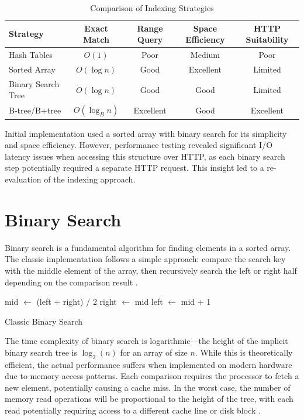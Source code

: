 \begin{table}[ht]
  \centering
  \caption{Comparison of Indexing Strategies}
  \begin{tabular}{l|c|c|c|c}
    \hline
    \textbf{Strategy} & \textbf{Exact Match} & \textbf{Range Query} & \textbf{Space Efficiency} & \textbf{HTTP Suitability} \\
    \hline
    Hash Tables & $O(1)$ & Poor & Medium & Poor \\
    Sorted Array & $O(\log n)$ & Good & Excellent & Limited \\
    Binary Search Tree & $O(\log n)$ & Good & Good & Limited \\
    B-tree/B+tree & $O(\log_B n)$ & Excellent & Good & Excellent \\
    \hline
  \end{tabular}
  \label{tab:indexing_strategies}
\end{table}

Initial implementation used a sorted array with binary search for its simplicity and space efficiency. However, performance testing revealed significant I/O latency issues when accessing this structure over HTTP, as each binary search step potentially required a separate HTTP request. This insight led to a re-evaluation of the indexing approach.

\section{Binary Search}
\label{tb:binary_search}

Binary search is a fundamental algorithm for finding elements in a sorted array. The classic implementation follows a simple approach: compare the search key with the middle element of the array, then recursively search the left or right half depending on the comparison result \citep{binary_search}.
\begin{algorithm}
  \BlankLine
  {
    mid $\leftarrow$ (left + right) / 2\;
    {
      right $\leftarrow$ mid\;
    }
    \Else
    {
      left $\leftarrow$ mid + 1\;
    }
  }
  \caption{Classic Binary Search}%
  \label{alg:binary_search}
\end{algorithm}

The time complexity of binary search is logarithmic—the height of the implicit binary search tree is $\log_2(n)$ for an array of size $n$. While this is theoretically efficient, the actual performance suffers when implemented on modern hardware due to memory access patterns. Each comparison requires the processor to fetch a new element, potentially causing a cache miss. In the worst case, the number of memory read operations will be proportional to the height of the tree, with each read potentially requiring access to a different cache line or disk block \citep{binary_search}.


